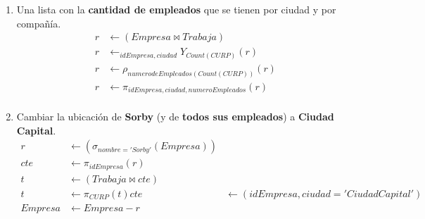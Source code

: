 \documentclass{article}
\begin{document}
\begin{enumerate}
{{\begin{enumerate}
{                        \textbf{Mr. Plow} en un \textbf{8\%}.
                        \begin{align*}
                            r &\leftarrow \pi_{idEmpresa}(\sigma_{nombre = 'Mr. Plow'}(Empresa)) \\
                            r &\leftarrow Trabaja \bowtie r \\
                            o &\leftarrow Trabaja - r \\
                            r &\leftarrow \pi_{CURP, idEmpresa, sueldo*1.08}(r)\\
                            r &\leftarrow \rho_{sueldo(sueldo*1.08)}(r)\\
                            Trabaja &\leftarrow r \cup o
                        \end{align*}
                    }
                    \item {
                        Una lista con la \textbf{cantidad de empleados} que se
                        tienen por ciudad y por compañía.
                         \begin{align*}
                            r &\leftarrow (Empresa \bowtie Trabaja)\\
                            r &\leftarrow _{idEmpresa,ciudad}Y_{Count(CURP)}(r)\\
                            r &\leftarrow \rho_{numerodeEmpleados(Count(CURP))}(r)\\
                            r &\leftarrow \pi_{idEmpresa,ciudad,numeroEmpleados}(r)\\
                         \end{align*}
                    }
                    \item {
                        Cambiar la ubicación de \textbf{Sorby} (y de 
                        \textbf{todos sus empleados}) a \textbf{Ciudad Capital}.
                         \begin{align*}
                            r &\leftarrow (\sigma_{nombre = 'Sorby'}(Empresa))\\
                            cte &\leftarrow \pi_{idEmpresa}(r)\\
                            t &\leftarrow (Trabaja \bowtie cte)\\
                            t &\leftarrow \pi_{CURP}(t)
                            cte &\leftarrow (idEmpresa, ciudad='Ciudad Capital')\\
                            Empresa &\leftarrow Empresa - r \\

\end{align*}}
\end{enumerate}}}
\end{enumerate}
\end{document}
